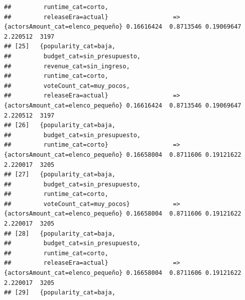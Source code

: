 \documentclass[
]{article}
\begin{document}
\begin{verbatim}
##         runtime_cat=corto,                                                                                                      
##         releaseEra=actual}                  => {actorsAmount_cat=elenco_pequeño} 0.16616424  0.8713546 0.19069647 2.220512  3197
## [25]   {popularity_cat=baja,                                                                                                    
##         budget_cat=sin_presupuesto,                                                                                             
##         revenue_cat=sin_ingreso,                                                                                                
##         runtime_cat=corto,                                                                                                      
##         voteCount_cat=muy_pocos,                                                                                                
##         releaseEra=actual}                  => {actorsAmount_cat=elenco_pequeño} 0.16616424  0.8713546 0.19069647 2.220512  3197
## [26]   {popularity_cat=baja,                                                                                                    
##         budget_cat=sin_presupuesto,                                                                                             
##         runtime_cat=corto}                  => {actorsAmount_cat=elenco_pequeño} 0.16658004  0.8711606 0.19121622 2.220017  3205
## [27]   {popularity_cat=baja,                                                                                                    
##         budget_cat=sin_presupuesto,                                                                                             
##         runtime_cat=corto,                                                                                                      
##         voteCount_cat=muy_pocos}            => {actorsAmount_cat=elenco_pequeño} 0.16658004  0.8711606 0.19121622 2.220017  3205
## [28]   {popularity_cat=baja,                                                                                                    
##         budget_cat=sin_presupuesto,                                                                                             
##         runtime_cat=corto,                                                                                                      
##         releaseEra=actual}                  => {actorsAmount_cat=elenco_pequeño} 0.16658004  0.8711606 0.19121622 2.220017  3205
## [29]   {popularity_cat=baja,                                                                                                    

\end{verbatim}
\end{document}
